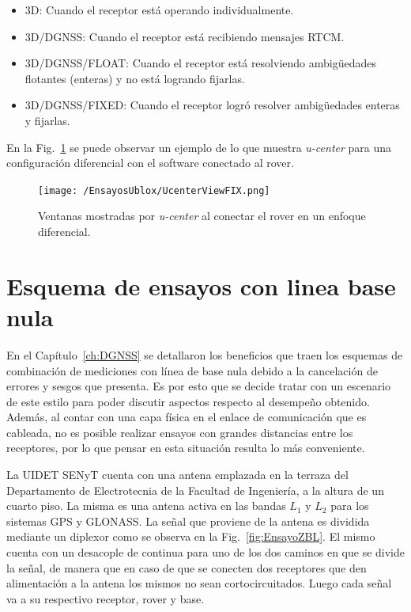 \documentclass[a4paper,12pt,oneside,onecolumn,final,openright]{book}%
\begin{document}
\begin{itemize}
	\item 3D: Cuando el receptor está operando individualmente.
	\item 3D/DGNSS: Cuando el receptor está recibiendo mensajes RTCM.
	\item 3D/DGNSS/FLOAT: Cuando el receptor está resolviendo ambigüedades flotantes (enteras) y no está logrando fijarlas.
	\item 3D/DGNSS/FIXED: Cuando el receptor logró resolver ambigüedades enteras y fijarlas.
\end{itemize}
	En la Fig.~\ref{fig:ucenter} se puede observar un ejemplo de lo que muestra \textit{u-center} para una configuración diferencial con el software conectado al rover.
\begin{figure}
    \centering
    \texttt{[image: /EnsayosUblox/UcenterViewFIX.png]}
    \caption{Ventanas mostradas por \textit{u-center} al conectar el rover en un enfoque diferencial.}
    \label{fig:ucenter}
\end{figure}

\section{Esquema de ensayos con linea base nula}\label{sec:esquema_ZBL}
	En el Capítulo~\ref{ch:DGNSS} se detallaron los beneficios que traen los esquemas de combinación de mediciones con línea de base nula debido a la cancelación de errores y sesgos que presenta. Es por esto que se decide tratar con un escenario de este estilo para poder discutir aspectos respecto al desempeño obtenido. Además, al contar con una capa física en el enlace de comunicación que es cableada, no es posible realizar ensayos con grandes distancias entre los receptores, por lo que pensar en esta situación resulta lo más conveniente.
	
	La UIDET SENyT cuenta con una antena emplazada en la terraza del Departamento de Electrotecnia de la Facultad de Ingeniería, a la altura de un cuarto piso. La misma es una antena activa en las bandas $L_1$ y $L_2$ para los sistemas GPS y GLONASS. La señal que proviene de la antena es dividida mediante un diplexor como se observa en la Fig.~\ref{fig:EnsayoZBL}. El mismo cuenta con un desacople de continua para uno de los dos caminos en que se divide la señal, de manera que en caso de que se conecten dos receptores que den alimentación a la antena los mismos no sean cortocircuitados. Luego cada señal va a su respectivo receptor, rover y base. 
\end{document}
